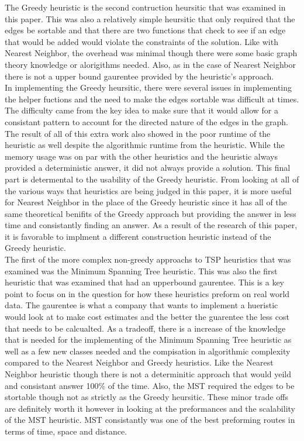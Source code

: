 \documentclass[midd]{thesis}
\newcommand{\tab}{\hspace*{2em}}
\begin{document}
\tab The Greedy heuristic is the second contruction heursitic that was examined in this paper. This was also a relatively simple heursitic that only required that the edges be sortable and that there are two functions that check to see if an edge that would be added would violate the constraints of the solution. Like with Nearest Neighbor, the overhead was minimal though there were some basic graph theory knowledge or alorigithms needed. Also, as in the case of Nearest Neighbor there is not a upper bound gaurentee provided by the heuristic's approach.\\
\tab In implementing the Greedy heursitic, there were several issues in implementing the helper fuctions and the need to make the edges sortable was difficult at times. The difficulty came from the key idea to make sure that it would allow for a consistant pattern to account for the directed nature of the edges in the graph. The result of all of this extra work also showed in the poor runtime of the heuristic as well despite the algorithmic runtime from the heuristic. While the memory usage was on par with the other heuristics and the heuristic always provided a deterministic answer, it did not always provide a solution. This final part is determental to the usability of the Greedy heuristic. From looking at all of the various ways that heuristics are being judged in this paper, it is more useful for Nearest Neighbor in the place of the Greedy heuristic since it has all of the same theoretical benifits of the Greedy approach but providing the answer in less time and consistantly finding an answer. As a result of the research of this paper, it is favorable to implment a different construction heuristic instead of the Greedy heuristic.\\
\tab The first of the more complex non-greedy approachs to TSP heuristics that was examined was the Minimum Spanning Tree heuristic. This was also the first heuristic that was examined that had an upperbound gaurentee. This is a key point to focus on in the question for how these heuristics preform on real world data. The gaurentee is what a company that wants to implement a hueristic would look at to make cost estimates and the better the guarentee the less cost that needs to be calcualted. As a tradeoff, there is a increase of the knowledge that is needed for the implementing of the Minimum Spanning Tree heuristic as well as a few new classes needed and the compisation in algorithmic complexity compared to the Nearest Neighbor and Greedy heuristics. Like the Nearest Neighbor heuristic though there is not a determinitic approach that would yeild and consistant answer 100\% of the time. Also, the MST required the edges to be stortable though not as strictly as the Greedy heursitic. These minor trade offs are definitely worth it however in looking at the preformances and the scalability of the MST heuristic. MST consistantly was one of the best preforming routes in terms of time, space and distance.\\
\end{document}
